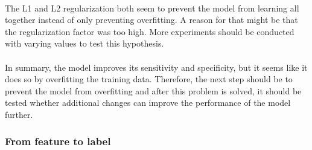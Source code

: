 \\
The L1 and L2 regularization both seem to prevent the model from learning all together instead of only preventing overfitting. A reason for that might be that the regularization factor was too high. More experiments should be conducted with varying values to test this hypothesis. \\
\\
In summary, the model improves its sensitivity and specificity, but it seems like it does so by overfitting the training data. Therefore, the next step should be to prevent the model from overfitting and after this problem is solved, it should be tested whether additional changes can improve the performance of the model further.



\subsubsection{From feature to label}

